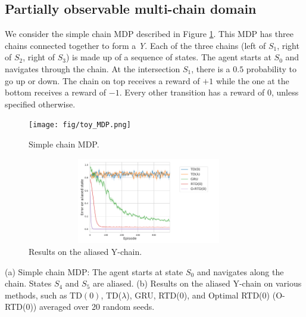 \subsection{Partially observable multi-chain domain}
We consider the simple chain MDP described in Figure \ref{fig:toy MDP}. This MDP has three chains connected together to form a \emph{Y}. Each of the three chains (left of $S_1$, right of $S_2$, right of $S_3$) is made up of a sequence of states. The agent starts at $S_0$ and navigates through the chain. At the intersection $S_1$, there is a $0.5$ probability to go up or down. The chain on top receives a reward of $+1$ while the one at the bottom receives a reward of $-1$. Every other transition has a reward of $0$, unless specified otherwise.
\begin{figure}[h]
\centering
    \texttt{[image: fig/toy\_MDP.png]}
    \caption{Simple chain MDP.}
    \label{fig:toy MDP}
\end{figure}
\begin{figure}[b]
    \centering
    \includegraphics[width=0.95\textwidth,height=3.75cm]{fig/POMDP.pdf}
    \caption{Results on the aliased Y-chain.}
    \label{fig:pomdp}
\end{figure}
(a) Simple chain MDP: The agent starts at state $S_0$ and navigates along the chain. States $S_4$ and $S_5$ are aliased. (b) Results on the aliased Y-chain on various methods, such as TD$(0)$, TD($\lambda$), GRU, RTD($0$), and Optimal RTD($0$) (O-RTD(0)) averaged over 20 random seeds.
